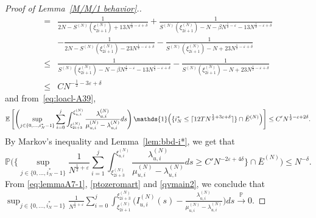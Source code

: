 \documentclass[11pt, reqno]{article}
\DeclarePairedDelimiter\autobracket{(}{)}
\newcommand{\br}[1]{\autobracket*{#1}}
\numberwithin{equation}{section}
\numberwithin{theorem}{section}
\newcommand{\pto}{\ensuremath{\xrightarrow{\ \mathbb{P}\ }}}  %
\begin{document}
\begin{appendix}
\begin{proof}[Proof of Lemma~\ref{M/M/1 behavior}.]
\begin{align*}
   =&\frac{1}{2N-S^{(N)}(\xi^{(N)}_{2i+1})+ 13 N^{\frac{1}{2}-\varepsilon+\delta}}+\frac{1}{S^{(N)}(\xi^{(N)}_{2i+1})-N-\beta N^{\frac{1}{2}-\varepsilon}-13 N^{\frac{1}{2}-\varepsilon+\delta}}\\
   &-\frac{1}{2N-S^{(N)}(\xi^{(N)}_{2i+1})- 23 N^{\frac{1}{2}-\varepsilon+\delta}}-\frac{1}{S^{(N)}(\xi^{(N)}_{2i+1})-N + 23N^{\frac{1}{2}-\varepsilon+\delta}}\\
   \leq&\frac{1}{S^{(N)}(\xi^{(N)}_{2i+1})-N-\beta N^{\frac{1}{2}-\varepsilon}- 13 N^{\frac{1}{2}-\varepsilon+\delta}}-\frac{1}{S^{(N)}(\xi^{(N)}_{2i+1})-N + 23N^{\frac{1}{2}-\varepsilon+\delta}}\\
    \leq& CN^{-\frac{1}{2}-3\varepsilon + \delta}
\end{align*}
and from~\eqref{eq:loacl-A39},
$$\mathbb{E}\left[\left(\sup_{j\in\{0,...,i^*_N-1\}} \sum_{i=0}^{j}\int_{\xi^{(N)}_{2i+3}}^{\xi^{(N)}_{u,i}}\frac{\lambda^{(N)}_{u,i}}{\mu^{(N)}_{u,i}-\lambda^{(N)}_{u,i}}ds\right)\mathds{1}\br{\{i^*_N \le \lceil 12TN^{\frac{1}{2}+3\varepsilon+\delta}\rceil\}\cap \bar{E}^{(N)}}\right]\leq C'N^{\frac{1}{2}-\varepsilon + 2\delta}.$$
By Markov's inequality and Lemma~\ref{lem:bbd-i*}, we get that
\begin{equation}\label{qvmain2}
    \mathbb{P}\bigg(\bigg\lbrace\sup_{j\in\{0,...,i^*_N-1\}} \frac{1}{N^{\frac{1}{2}+\varepsilon}}\sum_{i=1}^{j}\int_{\xi^{(N)}_{2i+3}}^{\xi^{(N)}_{u,i}}\frac{\lambda^{(N)}_{u,i}}{\mu^{(N)}_{u,i}-\lambda^{(N)}_{u,i}}ds\geq C'N^{-2\varepsilon+ 4\delta}\bigg\rbrace \cap \bar{E}^{(N)} \bigg)\leq N^{-\delta}.
\end{equation}
From \eqref{eq:lemmaA7-1}, \eqref{ptozeromart} and \eqref{qvmain2}, we conclude that
$\sup_{j\in\{0,...,i^*_N-1\}}\frac{1}{N^{\frac{1}{2}+\varepsilon}}\sum_{i=0}^j\int_{\xi^{(N)}_{2i+1}}^{\xi^{(N)}_{2i+3}}\Big(I^{(N)}_{u,i}(s)-\frac{\lambda^{(N)}_{u,i}}{\mu^{(N)}_{u,i}-\lambda^{(N)}_{u,i}}\Big)ds\pto0.$ 
\end{proof}




\end{appendix}
\end{document}
